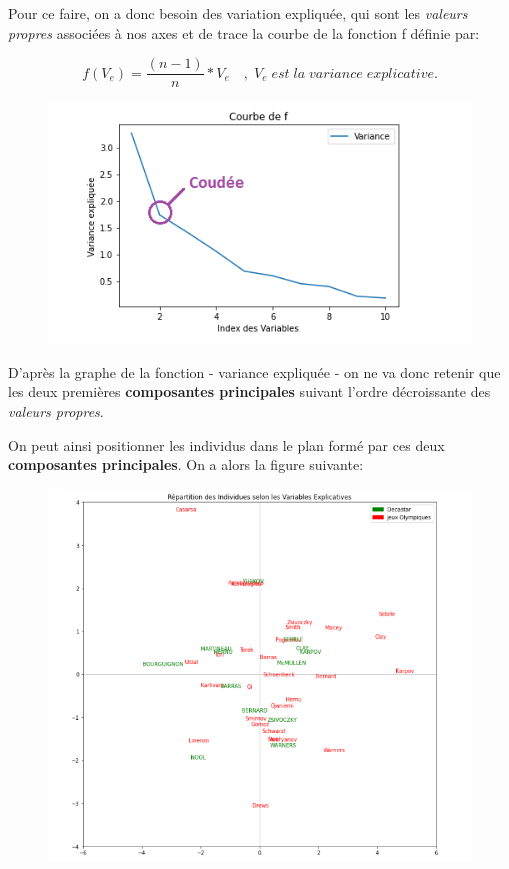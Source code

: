 \documentclass{article}
\begin{document}
Pour ce faire, on a donc besoin des variation expliquée, qui sont les \textit{valeurs propres} associées à nos axes et de trace la courbe de la fonction f définie par:

\begin{equation*}
f(V_e)=\frac{(n-1)}{n}*V_e \quad , \; V_e \; est \; la  \; variance \; explicative.
\end{equation*}

\begin{figure}[h!]
\includegraphics[width=\linewidth]{images/courbe_ve.png}
\end{figure}

D'après la graphe de la fonction - variance expliquée - on ne va donc retenir que les deux premières \textbf{composantes principales} suivant l'ordre décroissante des \textit{valeurs propres}.

\newpage

On peut ainsi positionner les individus dans le plan formé par ces deux \textbf{composantes principales}. On a alors la figure suivante:

\begin{figure}[h!]
\includegraphics[width=\linewidth]{images/graph-plan.png}
\end{figure}
\end{document}
